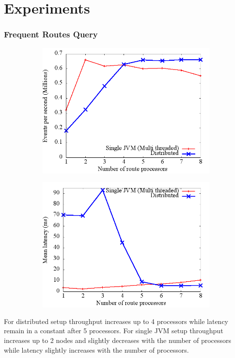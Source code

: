 \documentclass{beamer}
\begin{document}
\section{Experiments}

\begin{frame}
\frametitle{Frequent Routes Query}

\begin{figure}
        \centering
        \begin{subfigure}[b]{0.45\textwidth}
                \includegraphics[width=\textwidth]{throughput_route.png}
        \end{subfigure}
        \begin{subfigure}[b]{0.45\textwidth}
                \includegraphics[width=\textwidth]{latency_route.png}
        \end{subfigure}
\end{figure}

\footnotesize For distributed setup throughput increases up to 4 processors while latency remain in a constant after 5 processors. For single JVM setup throughput increases up to 2 nodes and slightly decreases with the number of processors while latency slightly increases with the number of processors.
 

\end{frame}
\end{document}
